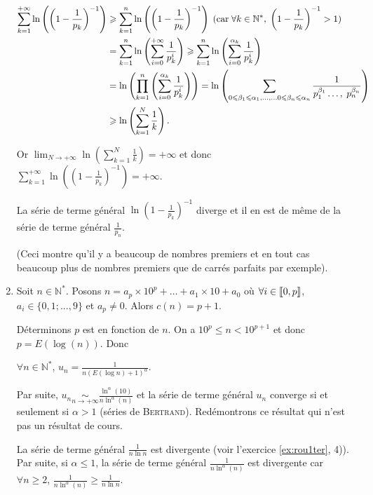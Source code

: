 \documentclass[11pt,a4paper]{article}
\newcommand{\Nn}{\mathbb{N}} \newcommand{\N}{\mathbb{N}}
\newcommand{\llbracket}{\left[\kern-0.15em\left[}
\newcommand{\rrbracket}{\right]\kern-0.15em\right]}
\begin{document}
\begin{enumerate}
\begin{align*}\ensuremath
\sum_{k=1}^{+\infty}\ln\left(\left(1-\frac{1}{p_k}\right)^{-1}\right)&\geqslant\sum_{k=1}^{n}\ln\left(\left(1-\frac{1}{p_k}\right)^{-1}\right)\;(\text{car}\;\forall k\in\Nn^*,\;\left(1-\frac{1}{p_k}\right)^{-1}> 1)\\
 &=\sum_{k=1}^{n}\ln\left(\sum_{i=0}^{+\infty}\frac{1}{p_k^i}\right)\geqslant\sum_{k=1}^{n}\ln\left(\sum_{i=0}^{\alpha_k}\frac{1}{p_k^i}\right)\\
  &=\ln\left(\prod_{k=1}^{n}\left(\sum_{i=0}^{\alpha_k}\frac{1}{p_k^i}\right)\right)=\ln\left(\sum_{0\leqslant\beta_1\leqslant\alpha_1,\ldots,\ldots0\leqslant\beta_n\leqslant\alpha_n}^{}\frac{1}{p_1^{\beta_1}\ldots,\;p_n^{\beta_n}}\right)\\
   &\geqslant\ln\left(\sum_{k=1}^{N}\frac{1}{k}\right).
\end{align*}

Or $\lim_{N \rightarrow +\infty}\ln\left(\sum_{k=1}^{N}\frac{1}{k}\right)=+\infty$ et donc $\sum_{k=1}^{+\infty}\ln\left(\left(1-\frac{1}{p_k}\right)^{-1}\right)=+\infty$.

La série de terme général $\ln\left(1-\frac{1}{p_k}\right)^{-1}$ diverge et il en est de même de la série de terme général $\frac{1}{p_n}$.

(Ceci montre qu'il y a beaucoup de nombres premiers et en tout cas beaucoup plus de nombres premiers que de carrés parfaits par exemple).

\item  Soit $n\in\Nn^*$. Posons $n =a_p\times10^p+\ldots+a_1\times10+a_0$ où $\forall i\in\llbracket0,p\rrbracket$, $a_i\in\{0,1;...,9\}$ et $a_p\neq 0$. Alors $c(n) = p+1$.

Déterminons $p$ est  en fonction de $n$. On a $10^p\leqslant n <10^{p+1}$ et donc $p=E\left(\log(n)\right)$. Donc

\begin{center}
$\forall n\in\Nn^*$, $u_n=\frac{1}{n(E(\log n)+1)^\alpha}$.
\end{center}

Par suite, $u_n\underset{n\rightarrow+\infty}{\sim}\frac{\ln^\alpha(10)}{n\ln^\alpha(n)}$ et la série de terme général $u_n$ converge si et seulement si $\alpha> 1$ (séries de \textsc{Bertrand}). Redémontrons ce résultat qui n'est pas un résultat de cours.

La série de terme général $\frac{1}{n\ln n}$ est divergente (voir l'exercice \ref{ex:rou1ter}, 4)). Par suite, si $\alpha\leqslant1$, la série de terme général $\frac{1}{n\ln^\alpha(n)}$ est divergente car $\forall n\geqslant2$, $\frac{1}{n\ln^\alpha(n)}\geqslant\frac{1}{n\ln n}$.


\end{enumerate}
\end{document}
